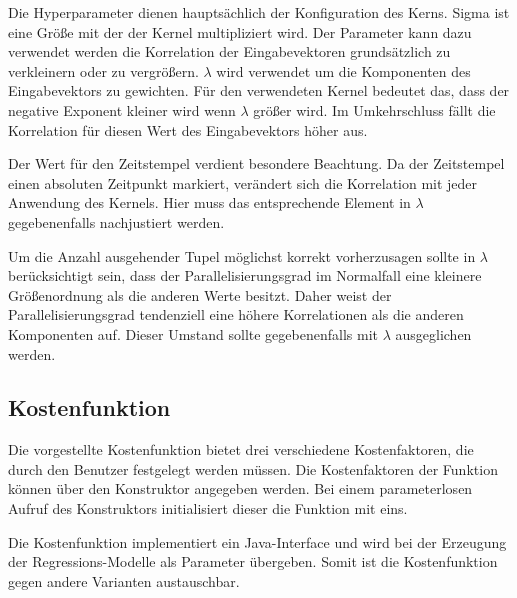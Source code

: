 Die Hyperparameter dienen hauptsächlich der Konfiguration des Kerns.
Sigma ist eine Größe mit der der Kernel multipliziert wird.
Der Parameter kann dazu verwendet werden die Korrelation der Eingabevektoren grundsätzlich zu verkleinern oder zu vergrößern.
\(\lambda\) wird verwendet um die Komponenten des Eingabevektors zu gewichten.
Für den verwendeten Kernel bedeutet das, dass der negative Exponent kleiner wird wenn \(\lambda\) größer wird.
Im Umkehrschluss fällt die Korrelation für diesen Wert des Eingabevektors höher aus.

Der Wert für den Zeitstempel verdient besondere Beachtung.
Da der Zeitstempel einen absoluten Zeitpunkt markiert, verändert sich die Korrelation mit jeder Anwendung des Kernels.
Hier muss das entsprechende Element in \(\lambda\) gegebenenfalls nachjustiert werden.

Um die Anzahl ausgehender Tupel möglichst korrekt vorherzusagen sollte in \(\lambda\) berücksichtigt sein, dass der Parallelisierungsgrad im Normalfall eine kleinere Größenordnung als die anderen Werte besitzt.
Daher weist der Parallelisierungsgrad tendenziell eine höhere Korrelationen als die anderen Komponenten auf.
Dieser Umstand sollte gegebenenfalls mit \(\lambda\) ausgeglichen werden.

\subsection{Kostenfunktion}

Die vorgestellte Kostenfunktion bietet drei verschiedene Kostenfaktoren, die durch den Benutzer festgelegt werden müssen.
Die Kostenfaktoren der Funktion können über den Konstruktor angegeben werden.
Bei einem parameterlosen Aufruf des Konstruktors initialisiert dieser die Funktion mit eins.

Die Kostenfunktion implementiert ein Java-Interface und wird bei der Erzeugung der Regressions-Modelle als Parameter übergeben.
Somit ist die Kostenfunktion gegen andere Varianten austauschbar.






